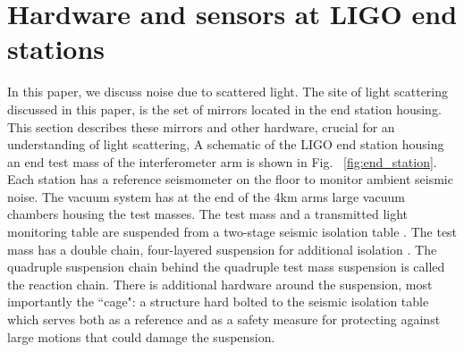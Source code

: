 \documentclass[12pt]{iopart}
\begin{document}
\section{Hardware and sensors at LIGO end stations}\label{hardware} In this paper, we discuss noise due to scattered light. The site of light scattering discussed in this paper, is the set of mirrors located in the end station housing. This section describes these mirrors and other hardware, crucial for an understanding of light scattering,
A schematic of the LIGO end station housing an end test mass \cite{ETM_ref} of the interferometer arm is shown in Fig. ~\ref{fig:end_station}. Each station has a reference seismometer on the floor to monitor ambient seismic noise. The vacuum system has at the end of the 4km arms large vacuum chambers housing the test masses. The test mass and a transmitted light monitoring table are suspended from a two-stage seismic isolation table \cite{Matichard_2015}. The test mass has a double chain, four-layered suspension for additional isolation \cite{Aston_2012}. The quadruple suspension chain behind the quadruple test mass suspension is called the reaction chain. There is additional hardware around the suspension, most importantly the ``cage": a structure hard bolted to the seismic isolation table which serves both as a reference and as a safety measure for protecting against large motions that could damage the suspension.
\end{document}
